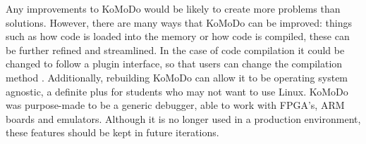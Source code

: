%
Any improvements to KoMoDo would be likely to create more problems than solutions. However, there are many ways that KoMoDo can be improved: things such as how code is loaded into the memory or how  code is compiled, these can be further refined and streamlined. In the case of code compilation it could be changed to follow a plugin interface, so that users can change the compilation method . Additionally, rebuilding KoMoDo can allow it to be operating system agnostic, a definite plus for students who may not want to use Linux. KoMoDo was purpose-made to be a generic debugger, able to work with FPGA's, ARM boards and emulators. Although it is no longer used in a production environment, these features should be kept in future iterations.
